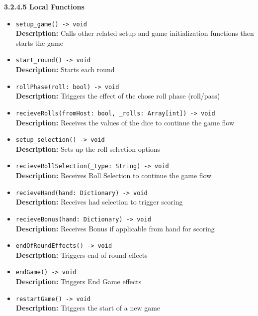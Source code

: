 \documentclass[12pt, titlepage]{article}
\begin{document}
\textbf{3.2.4.5 Local Functions}
\begin{itemize}
    \item \texttt{setup\_game() -> void}\\
    \textbf{Description:} Calls other related setup and game initialization functions then starts the game 
    
    \item \texttt{start\_round() -> void}\\
    \textbf{Description:} Starts each round
    
    \item \texttt{rollPhase(roll: bool) -> void}\\
    \textbf{Description:} Triggers the effect of the chose roll phase (roll/pass)
    
    \item \texttt{recieveRolls(fromHost: bool, \_rolls: Array[int]) -> void}\\
    \textbf{Description:} Receives the values of the dice to continue the game flow
    
    \item \texttt{setup\_selection() -> void}\\
    \textbf{Description:} Sets up the roll selection options
    
    \item \texttt{recieveRollSelection(\_type: String) -> void}\\
    \textbf{Description:} Receives Roll Selection to continue the game flow
    
    \item \texttt{recieveHand(hand: Dictionary) -> void}\\
    \textbf{Description:} Receives had selection to trigger scoring
    
    \item \texttt{recieveBonus(hand: Dictionary) -> void}\\
    \textbf{Description:} Receives Bonus if applicable from hand for scoring
    
    \item \texttt{endOfRoundEffects() -> void}\\
    \textbf{Description:} Triggers end of round effects
    
    \item \texttt{endGame() -> void}\\
    \textbf{Description:}  Triggers End Game effects
    
    \item \texttt{restartGame() -> void}\\
    \textbf{Description:} Triggers the start of a new game
    

\end{itemize}
\end{document}

